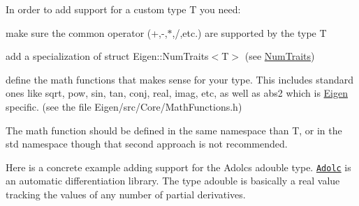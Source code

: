 In order to add support for a custom type {\ttfamily T} you need\+:
\begin{DoxyEnumerate}
\item make sure the common operator (+,-\/,$\ast$,/,etc.) are supported by the type {\ttfamily T} 
\item add a specialization of struct Eigen\+::\+Num\+Traits$<$\+T$>$ (see \hyperlink{group___core___module}{Num\+Traits})
\item define the math functions that makes sense for your type. This includes standard ones like sqrt, pow, sin, tan, conj, real, imag, etc, as well as abs2 which is \hyperlink{namespace_eigen}{Eigen} specific. (see the file Eigen/src/\+Core/\+Math\+Functions.\+h)
\end{DoxyEnumerate}

The math function should be defined in the same namespace than {\ttfamily T}, or in the {\ttfamily std} namespace though that second approach is not recommended.

Here is a concrete example adding support for the Adolc\textquotesingle{}s {\ttfamily adouble} type. \href{https://projects.coin-or.org/ADOL-C}{\tt Adolc} is an automatic differentiation library. The type {\ttfamily adouble} is basically a real value tracking the values of any number of partial derivatives.


